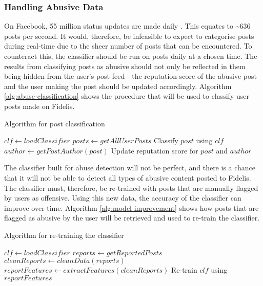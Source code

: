 \subsubsection{Handling Abusive Data}
On Facebook, 55 million status updates are made daily \cite{kissmetrics:fb-stats}. This equates to \textasciitilde 636 posts per second. It would, therefore, be infeasible to expect to categorise posts during real-time due to the sheer number of posts that can be encountered. To counteract this, the classifier should be run on posts daily at a chosen time. The results from classifying posts as abusive should not only be reflected in them being hidden from the user's post feed - the reputation score of the abusive post and the user making the post should be updated accordingly. Algorithm \ref{alg:abuse-classification} shows the procedure that will be used to classify user posts made on Fidelis.

\begin{algorithm}
\caption{Algorithm for post classification}
\label{alg:abuse-classification}
\begin{algorithmic}[1]
\State $clf\gets loadClassifier$
\State $posts\gets getAllUserPosts$
    \State Classify $post$ using $clf$
        \State $author\gets getPostAuthor(post)$
        \State Update reputation score for $post$ and $author$
    \EndIf
\EndFor
\end{algorithmic}
\end{algorithm}

The classifier built for abuse detection will not be perfect, and there is a chance that it will not be able to detect all types of abusive content posted to Fidelis. The classifier must, therefore, be re-trained with posts that are manually flagged by users as offensive. Using this new data, the accuracy of the classifier can improve over time. Algorithm \ref{alg:model-improvement} shows how posts that are flagged as abusive by the user will be retrieved and used to re-train the classifier.

\begin{algorithm}
\caption{Algorithm for re-training the classifier}
\label{alg:model-improvement}
\begin{algorithmic}[1]
\State $clf\gets loadClassifier$
\State $reports\gets getReportedPosts$
\State $cleanReports\gets cleanData(reports)$
\State $reportFeatures\gets extractFeatures(cleanReports)$
\State Re-train $clf$ using $reportFeatures$
\end{algorithmic}
\end{algorithm}